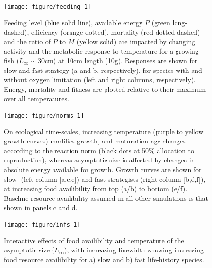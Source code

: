 \documentclass[11pt]{article}\usepackage[]{graphicx}\usepackage[]{color,soul}
\begin{document}
\begin{figure}[!ht]
{\centering 
\texttt{[image: figure/feeding-1]} 
}
\caption[Feeding level (blue solid line), available energy $P$ (green long-dashed), efficiency (orange dotted), mortality (red dotted-dashed) and the ratio of $P$ to $M$ (yellow solid) are impacted by changing activity and the metabolic response to temperature for a growing fish ($L_{\infty}\sim 30$cm) at 10cm length (10g)]{Feeding level (blue solid line), available energy $P$ (green long-dashed), efficiency (orange dotted), mortality (red dotted-dashed) and the ratio of $P$ to $M$ (yellow solid) are impacted by changing activity and the metabolic response to temperature for a growing fish ($L_{\infty}\sim 30$cm) at 10cm length (10g). Responses are shown for slow  and fast strategy (a and b, respectively), for species with and without oxygen limitation (left and right columns, respectively). Energy, mortality and fitness are plotted relative to their maximum over all temperatures.}\label{fig:feeding}
\end{figure}

\begin{figure}[!ht]
{\centering 
\texttt{[image: figure/norms-1]} 
}
\caption[On ecological time-scales, increasing temperature (purple to yellow growth curves) modifies growth, and maturation age changes according to the reaction norm (black dots at 50\% allocation to reproduction), whereas asymptotic size is affected by changes in absolute energy available for growth]{On ecological time-scales, increasing temperature (purple to yellow growth curves) modifies growth, and maturation age changes according to the reaction norm (black dots at 50\% allocation to reproduction), whereas asymptotic size is affected by changes in absolute energy available for growth. Growth curves are shown for slow- (left column [a,c,e]) and fast strategists (right column [b,d,f]), at increasing food availibility from top (a/b) to bottom (e/f). Baseline resource availibility assumed in all other simulations is that shown in panels c and d.}\label{fig:norms}
\end{figure}

\begin{figure}[!ht]
{\centering 
\texttt{[image: figure/infs-1]} 
}
\caption[Interactive effects of food availibility and temperature on the asymptotic size ($L_{\infty}$), with increasing linewidth showing increasing food resource availibility for a) slow and b) fast life-history species]{Interactive effects of food availibility and temperature of the asymptotic size ($L_{\infty}$), with increasing linewidth showing increasing food resource availibility for a) slow and b) fast life-history species.}\label{fig:infs}
\end{figure}
\end{document}
